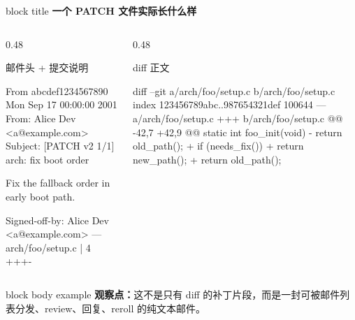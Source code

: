 \documentclass[aspectratio=169,professionalfonts]{beamer}
\newcommand{\sectiontitle}[1]{
  \begin{beamercolorbox}[wd=\linewidth,sep=0.7em,rounded=true]{block title}
    \usebeamerfont*{frametitle}\Large\bfseries #1
  \end{beamercolorbox}
  \vspace{0.4em}
}
\begin{document}
\begin{frame}[fragile]
  \sectiontitle{一个 PATCH 文件实际长什么样}
  \fontsize{6.5}{7.2}\selectfont
  \begin{columns}[T,totalwidth=\textwidth]
    \begin{column}{0.48\textwidth}
      \begin{exampleblock}{邮件头 + 提交说明}
\begin{semiverbatim}
From abcdef1234567890 Mon Sep 17 00:00:00 2001
From: Alice Dev <a@example.com>
Subject: [PATCH v2 1/1] arch: fix boot order

Fix the fallback order in early boot path.

Signed-off-by: Alice Dev <a@example.com>
---
 arch/foo/setup.c | 4 +++-
\end{semiverbatim}
      \end{exampleblock}
    \end{column}
    \begin{column}{0.48\textwidth}
      \begin{alertblock}{diff 正文}
\begin{semiverbatim}
diff --git a/arch/foo/setup.c b/arch/foo/setup.c
index 123456789abc..987654321def 100644
--- a/arch/foo/setup.c
+++ b/arch/foo/setup.c
@@ -42,7 +42,9 @@ static int foo_init(void)
-    return old_path();
+    if (needs_fix())
+        return new_path();
+    return old_path();
\end{semiverbatim}
      \end{alertblock}
    \end{column}
  \end{columns}
  \vspace{0.2em}
  \begin{beamercolorbox}[wd=\linewidth,sep=0.7em,rounded=true]{block body example}
    \textbf{观察点：}这不是只有 diff 的补丁片段，而是一封可被邮件列表分发、review、回复、reroll 的纯文本邮件。
  \end{beamercolorbox}
\end{frame}
\end{document}
